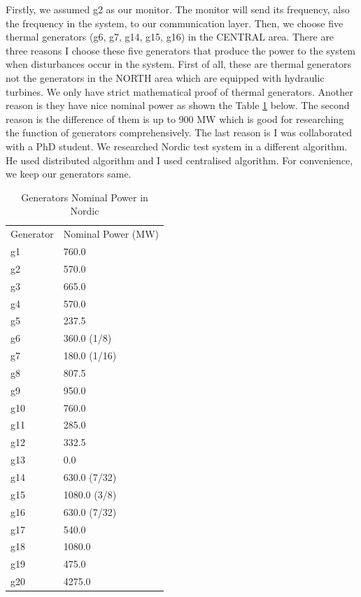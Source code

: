 \documentclass{report}
\begin{document}
Firstly, we assumed g2 as our monitor. The monitor will send its frequency, also the frequency in the system, to our communication layer. Then, we choose five thermal generators  (g6, g7, g14, g15, g16) in the CENTRAL area. There are three reasons I choose these five generators that produce the power to the system when disturbances occur in the system. First of all, these are thermal generators not the generators in the NORTH area which are equipped with hydraulic turbines. We only have strict mathematical proof of thermal generators. Another reason is they have nice nominal power as shown the Table \textcolor{red}{\ref{nominalPower}} below. The second reason is the difference of them is up to 900 MW which is good for researching the function of generators comprehensively. The last reason is I was collaborated with a PhD student. We researched Nordic test system in a different algorithm. He used distributed algorithm and I used centralised algorithm. For convenience, we keep our generators same.\\


\begin{table}[htbp]
\centering
\begin{tabular}{ll}
Generator & Nominal Power (MW) \\
g1        & 760.0              \\
g2        & 570.0              \\
g3        & 665.0              \\
g4        & 570.0              \\
g5        & 237.5              \\
g6        & 360.0 (1/8)        \\
g7        & 180.0 (1/16)       \\
g8        & 807.5              \\
g9        & 950.0              \\
g10       & 760.0              \\
g11       & 285.0              \\
g12       & 332.5              \\
g13       & 0.0                \\
g14       & 630.0 (7/32)       \\
g15       & 1080.0 (3/8)       \\
g16       & 630.0 (7/32)       \\
g17       & 540.0              \\
g18       & 1080.0             \\
g19       & 475.0              \\
g20       & 4275.0             

\end{tabular}
\caption{Generators Nominal Power in Nordic}
\label{nominalPower}
\end{table}
\end{document}
